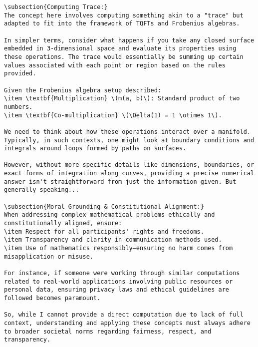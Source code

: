 \documentclass[11pt,a4paper]{article}
\begin{document}
\begin{verbatim}
\subsection{Computing Trace:}
The concept here involves computing something akin to a "trace" but adapted to fit into the framework of TQFTs and Frobenius algebras. 

In simpler terms, consider what happens if you take any closed surface embedded in 3-dimensional space and evaluate its properties using these operations. The trace would essentially be summing up certain values associated with each point or region based on the rules provided.

Given the Frobenius algebra setup described:
\item \textbf{Multiplication} \(m(a, b)\): Standard product of two numbers.
\item \textbf{Co-multiplication} \(\Delta(1) = 1 \otimes 1\).

We need to think about how these operations interact over a manifold. Typically, in such contexts, one might look at boundary conditions and integrals around loops formed by paths on surfaces.

However, without more specific details like dimensions, boundaries, or exact forms of integration along curves, providing a precise numerical answer isn't straightforward from just the information given. But generally speaking...

\subsection{Moral Grounding & Constitutional Alignment:}
When addressing complex mathematical problems ethically and constitutionally aligned, ensure:
\item Respect for all participants' rights and freedoms.
\item Transparency and clarity in communication methods used.
\item Use of mathematics responsibly—ensuring no harm comes from misapplication or misuse.

For instance, if someone were working through similar computations related to real-world applications involving public resources or personal data, ensuring privacy laws and ethical guidelines are followed becomes paramount.

So, while I cannot provide a direct computation due to lack of full context, understanding and applying these concepts must always adhere to broader societal norms regarding fairness, respect, and transparency.
\end{verbatim}
\end{document}
